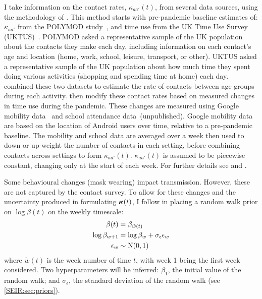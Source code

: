 \documentclass[thesis.tex]{subfiles}
\begin{document}
I take information on the contact rates, $\kappa_{aa'}(t)$, from several data sources, using the methodology of \textcite{vanleeuwenTime,vanleeuwenAugmenting}.
This method starts with pre-pandemic baseline estimates of: $\kappa_{aa'}$ from the POLYMOD study~\autocite{mossongSocial}, and time use from the UK Time Use Survey (UKTUS)~\autocite{UKTUS}.
POLYMOD asked a representative sample of the UK population about the contacts they make each day, including information on each contact's age and location (home, work, school, leisure, transport, or other).
UKTUS asked a representative sample of the UK population about how much time they spent doing various activities (\eg shopping and spending time at home) each day.
\Textcite{vanleeuwenAugmenting} combined these two datasets to estimate the rate of contacts between age groups during each activity.
\Textcite{birrellRealtime} then modify these contact rates based on measured changes in time use during the pandemic.
These changes are measured using Google mobility data~\autocite{googleCOVID19} and school attendance data~(unpublished).
Google mobility data are based on the location of Android users over time, relative to a pre-pandemic baseline.
The mobility and school data are averaged over a week then used to down or up-weight the number of contacts in each setting, before combining contacts across settings to form $\kappa_{aa'}(t)$.
$\kappa_{aa'}(t)$ is assumed to be piecewise constant, changing only at the start of each week.
For further details see \textcite{vanleeuwenAugmenting} and \textcite[supplementary material]{birrellRealtime}.

Some behavioural changes (\eg mask wearing) impact transmission.
However, these are not captured by the contact survey.
To allow for these changes and the uncertainty produced in formulating $\bm{\kappa}(t)$, I follow \textcite{birrellRealtime} in placing a random walk prior on $\log\beta(t)$  on the weekly timescale:
\begin{align}
    \beta(t) &= \beta_{\tilde{w}(t)} \\
    \log\beta_{w+1} &= \log\beta_w + \sigma_\epsilon \epsilon_w \\
    \epsilon_w &\sim \operatorname{N}(0, 1)
\end{align}
where $\tilde{w}(t)$ is the week number of time $t$, with week 1 being the first week considered.
Two hyperparameters will be inferred: $\beta_1$, the initial value of the random walk; and $\sigma_\epsilon$, the standard deviation of the random walk (see \cref{SEIR:sec:priors}).
\end{document}

